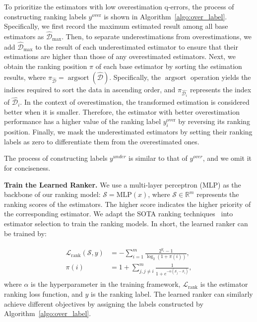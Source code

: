 To prioritize the estimators with low overestimation q-errors, the process of constructing ranking labels $y^{\mathrm{over}}$ is shown in Algorithm~\ref{algo:over_label}. Specifically, we first record the maximum estimated result among all base estimators as $\hat{\mathcal{D}}_{\mathrm{max}}$. Then, to separate underestimations from overestimations, we add $\hat{\mathcal{D}}_{\mathrm{max}}$ to the result of each underestimated estimator to ensure that their estimations are higher than those of any overestimated estimators. Next, we obtain the ranking position $\pi$ of each base estimator by sorting the estimation results, where $\pi_{\hat{\mathcal{D}}}=\operatorname{argsort}(\hat{\mathcal{D}})$. Specifically, the $\operatorname{argsort}$ operation yields the indices required to sort the data in ascending order, and $\pi_{\hat{\mathcal{D}_i}}$ represents the index of $\hat{\mathcal{D}_i}$. In the context of overestimation, the transformed estimation is considered better when it is smaller. Therefore, the estimator with better overestimation performance has a higher value of the ranking label $y_i^{\mathrm{over}}$ by reversing its ranking position. Finally, we mask the underestimated estimators by setting their ranking labels as zero to differentiate them from the overestimated ones. 

The process of constructing labels $y^{under}$ is similar to that of $y^{over}$, and we omit it for conciseness.


\noindent\textbf{Train the Learned Ranker.} 
We use a multi-layer perceptron (MLP) as the backbone of our ranking model: $\mathcal{S}=\mathrm{MLP}(x)$, where $\mathcal{S}\in\mathbb{R}^m$ represents the ranking scores of the estimators. The higher score indicates the higher priority of the corresponding estimator. We adapt the SOTA ranking techniques~\cite{bruch2019revisiting,listmle_xia2008listwise,TensorflowRankingKDD2019,wang2018lambdaloss} into estimator selection to train the ranking models. In short, the learned ranker can be trained by:

\begin{align}
\begin{aligned}
    \mathcal{L}_{\mathrm{rank}}(\mathcal{S},y)&= - \sum_{i=1}^m\frac{2^{y_i}-1}{\log_2(1+\pi(i))} ,\\
    \pi(i)&=1+\sum_{j,j\ne i}^m\frac{1}{1+e^{-\alpha(\mathcal{S}_j-\mathcal{S}_i)}},
\end{aligned}
    \label{eq:ranking}
\end{align}
where $\alpha$ is the hyperparameter in the training framework, $\mathcal{L}_{\mathrm{rank}}$ is the estimator ranking loss function, and $y$ is the ranking label. The learned ranker can similarly achieve different objectives by assigning the labels constructed by Algorithm~\ref{algo:over_label}. 





